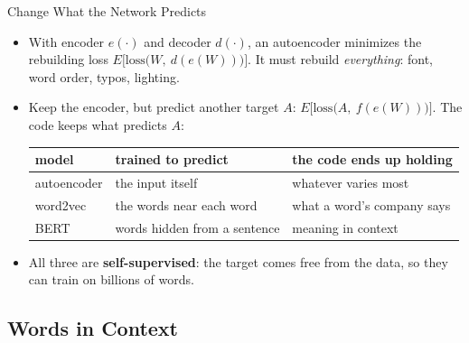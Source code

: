 \documentclass[aspectratio=169,11pt,xcolor=dvipsnames]{beamer}
\newcommand{\E}{E}
\begin{document}
\begin{frame}{Change What the Network Predicts}
\begin{itemize}\itemsep2pt
  \item With encoder $e(\cdot)$ and decoder $d(\cdot)$, an autoencoder minimizes the
        rebuilding loss $\E\big[\text{loss}\big(W,\ d(e(W))\big)\big]$. It must rebuild
        \emph{everything}: font, word order, typos, lighting.
  \item Keep the encoder, but predict another target $A$:
        $\E\big[\text{loss}\big(A,\ f(e(W))\big)\big]$. The code keeps what predicts $A$:
  \begin{center}\small
  \renewcommand{\arraystretch}{1.0}
  \begin{tabular}{@{}lll@{}}
  \toprule
  model & trained to predict & the code ends up holding \\
  \midrule
  autoencoder & the input itself & whatever varies most \\
  word2vec & the words near each word & what a word's company says \\
  BERT & words hidden from a sentence & meaning in context \\
  \bottomrule
  \end{tabular}
  \end{center}
  \item All three are \textbf{self-supervised}: the target comes free from the data, so they
        can train on billions of words.
\end{itemize}
\end{frame}

\subsection{Words in Context}
\end{document}
